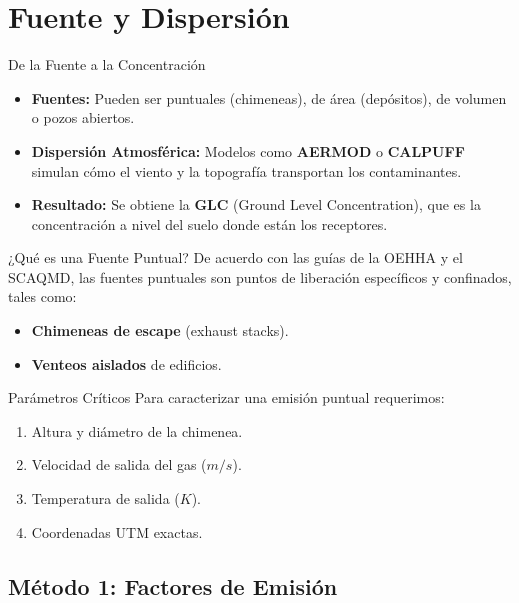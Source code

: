 \documentclass[10pt,compress]{beamer}
\begin{document}
\section{Fuente y Dispersión}
\begin{frame}{De la Fuente a la Concentración}
    \begin{itemize}
        \item \textbf{Fuentes:} Pueden ser puntuales (chimeneas), de área (depósitos), de volumen o pozos abiertos.
        \item \textbf{Dispersión Atmosférica:} Modelos como \textbf{AERMOD} o \textbf{CALPUFF} simulan cómo el viento y la topografía transportan los contaminantes.
        \item \textbf{Resultado:} Se obtiene la \textbf{GLC} (Ground Level Concentration), que es la concentración a nivel del suelo donde están los receptores.
    \end{itemize}
\end{frame}

\begin{frame}{¿Qué es una Fuente Puntual?}
    De acuerdo con las guías de la OEHHA y el SCAQMD, las fuentes puntuales son puntos de liberación específicos y confinados, tales como:
    \begin{itemize}
        \item \textbf{Chimeneas de escape} (exhaust stacks).
        \item \textbf{Venteos aislados} de edificios.
    \end{itemize}
    \begin{block}{Parámetros Críticos}
        Para caracterizar una emisión puntual requerimos:
        \begin{enumerate}
            \item Altura y diámetro de la chimenea.
            \item Velocidad de salida del gas ($m/s$).
            \item Temperatura de salida ($K$).
            \item Coordenadas UTM exactas.
        \end{enumerate}
    \end{block}
\end{frame}

\subsection{Método 1: Factores de Emisión}
\end{document}
